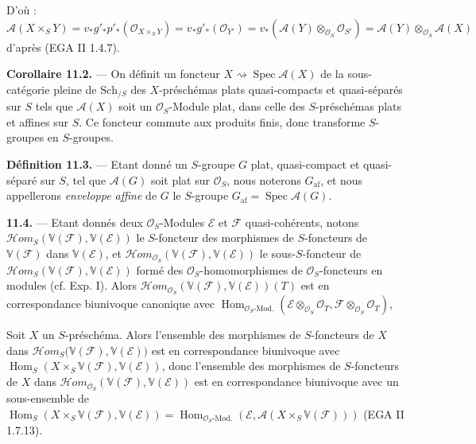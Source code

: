 \documentclass[11pt,a4paper]{article}
\begin{document}
D'où :
\[
\mathcal{A}(X \times_{S} Y) = v_{*} g'_{*} p'_{*}(\mathcal{O}_{X \times_{S} Y})
= v_{*} g'_{*}(\mathcal{O}_{Y'})
= v_{*}(\mathcal{A}(Y) \otimes_{\mathcal{O}_{S}} \mathcal{O}_{S'})
= \mathcal{A}(Y) \otimes_{\mathcal{O}_{S}} \mathcal{A}(X)
\]
d'après (EGA II 1.4.7).

\textbf{Corollaire 11.2.} — On définit un foncteur
$X \rightsquigarrow \operatorname{Spec} \mathcal{A}(X)$ de la
sous-catégorie pleine de $\mathrm{Sch}_{/S}$ des $X$-préschémas plats
quasi-compacts et quasi-séparés sur $S$ tels que $\mathcal{A}(X)$ soit un
$\mathcal{O}_{S}$-Module plat, dans celle des $S$-préschémas plats et
affines sur $S$. Ce foncteur commute aux produits finis, donc transforme
$S$-groupes en $S$-groupes.

\textbf{Définition 11.3.} — Etant donné un $S$-groupe $G$ plat,
quasi-compact et quasi-séparé sur $S$, tel que $\mathcal{A}(G)$ soit plat
sur $\mathcal{O}_{S}$, nous noterons $G_{\mathrm{af}}$, et nous appellerons
\emph{enveloppe affine} de $G$ le $S$-groupe
$G_{\mathrm{af}} = \operatorname{Spec} \mathcal{A}(G)$.

\textbf{11.4.} — Etant donnés deux $\mathcal{O}_{S}$-Modules $\mathcal{E}$
et $\mathcal{F}$ quasi-cohérents, notons
$\mathcal{H}om_{S}(\mathbb{V}(\mathcal{F}), \mathbb{V}(\mathcal{E}))$ le
$S$-foncteur des morphismes de $S$-foncteurs de $\mathbb{V}(\mathcal{F})$
dans $\mathbb{V}(\mathcal{E})$, et
$\mathcal{H}om_{\mathcal{O}_{S}}(\mathbb{V}(\mathcal{F}), \mathbb{V}(\mathcal{E}))$
le sous-$S$-foncteur de
$\mathcal{H}om_{S}(\mathbb{V}(\mathcal{F}), \mathbb{V}(\mathcal{E}))$ formé
des $\mathcal{O}_{S}$-homomorphismes de $\mathcal{O}_{S}$-foncteurs en
modules (cf. Exp. I). Alors
$\mathcal{H}om_{\mathcal{O}_{S}}(\mathbb{V}(\mathcal{F}), \mathbb{V}(\mathcal{E}))(T)$
est en correspondance biunivoque canonique avec \struck{\ill{}}
$\operatorname{Hom}_{\mathcal{O}_{S}\text{-Mod.}}
(\mathcal{E} \otimes_{\mathcal{O}_{S}} \mathcal{O}_{T},
\mathcal{F} \otimes_{\mathcal{O}_{S}} \mathcal{O}_{T})$, 

Soit $X$ un $S$-préschéma. Alors l'ensemble des morphismes de $S$-foncteurs
de $X$ dans
$\mathcal{H}om_{S}($\struck{\ill{}}$\mathbb{V}(\mathcal{F}), \mathbb{V}(\mathcal{E}))$
est en correspondance biunivoque avec
$\operatorname{Hom}_{S}(X \times_{S} \mathbb{V}(\mathcal{F}), \mathbb{V}(\mathcal{E}))$,
donc l'ensemble des morphismes de $S$-foncteurs de $X$ dans
$\mathcal{H}om_{\mathcal{O}_{S}}(\mathbb{V}(\mathcal{F}), \mathbb{V}(\mathcal{E}))$
est en correspondance biunivoque avec un sous-ensemble de
$\operatorname{Hom}_{S}(X \times_{S} \mathbb{V}(\mathcal{F}), \mathbb{V}(\mathcal{E}))
= \operatorname{Hom}_{\mathcal{O}_{S}\text{-Mod.}}
(\mathcal{E}, \mathcal{A}(X \times_{S} \mathbb{V}(\mathcal{F})))$
(EGA II 1.7.13).
\end{document}
